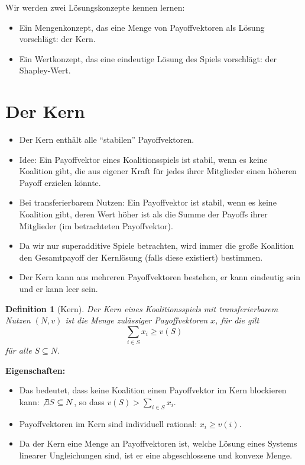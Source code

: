 \documentclass[12pt]{extreport} %
\theoremstyle{named}
\theoremstyle{itshape}
\newtheorem*{definition}{Definition}
\theoremstyle{normal}
\begin{document}
Wir werden zwei Lösungskonzepte kennen lernen:
\begin{itemize}
	\item Ein Mengenkonzept, das eine Menge von Payoffvektoren als Lösung vorschlägt: der Kern.
	\item Ein Wertkonzept, das eine eindeutige Lösung des Spiels vorschlägt: der Shapley-Wert.
\end{itemize}

\section{Der Kern} 

\begin{itemize}
	\item Der Kern enthält alle \enquote{stabilen} Payoffvektoren.
	\item Idee: Ein Payoffvektor eines Koalitionsspiels ist stabil, wenn es keine Koalition gibt, die aus eigener Kraft für jedes ihrer Mitglieder einen höheren Payoff erzielen könnte.
	\item Bei transferierbarem Nutzen: Ein Payoffvektor ist stabil, wenn es keine Koalition gibt, deren Wert höher ist als die Summe der Payoffs ihrer Mitglieder (im betrachteten Payoffvektor).
	\item Da wir nur superadditive Spiele betrachten, wird immer die große Koalition den Gesamtpayoff der Kernlösung (falls diese existiert) bestimmen.
	\item Der Kern kann aus mehreren Payoffvektoren bestehen, er kann eindeutig sein und er kann leer sein.
\end{itemize}

\begin{definition}[Kern]
	Der Kern eines Koalitionsspiels mit transferierbarem Nutzen $(N, v)$ ist die Menge zulässiger Payoffvektoren $x$, für die gilt
	$$ \sum_{i \in S} x_i \geq v(S) $$
	für alle $S \subseteq N$.
\end{definition}

\textbf{Eigenschaften:}
\begin{itemize}
	\item Das bedeutet, dass keine Koalition einen Payoffvektor im Kern blockieren kann: $\not\exists S \subseteq N$, so dass $v(S) > \sum_{i \in S} x_i$.
	\item Payoffvektoren im Kern sind individuell rational: $x_i \geq v(i)$.
	\item Da der Kern eine Menge an Payoffvektoren ist, welche Lösung eines Systems linearer Ungleichungen sind, ist er eine abgeschlossene und konvexe Menge.
\end{itemize}
\end{document}
